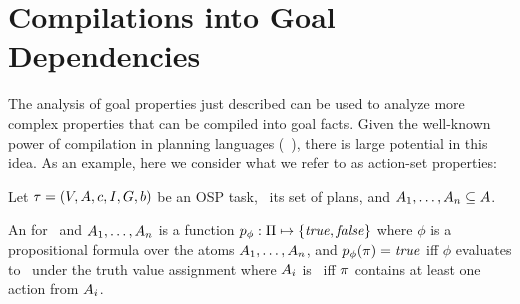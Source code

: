 \section{Compilations into Goal Dependencies}
\label{compilation}


The analysis of goal properties just described can be used to analyze
more complex properties that can be compiled into goal facts. Given
the well-known power of compilation in planning languages
(\eg\ \cite{gazen:knoblock:ecp-97,nebel:jair-00,edelkamp:icaps-06,palacios:geffner:jair-09,baier:etal:ai-09}),
there is large potential in this idea. As an example, here we consider
what we refer to as action-set properties:

%
\begin{definition}\label{def:action-set-properties}
Let $\tau =
(V,\allowbreak A,\allowbreak{\ensuremath{c}},\allowbreak I,\allowbreak G,\allowbreak{\ensuremath{b}})$
be an OSP task, \plans\ its set of plans, and $A_1, \dots, A_n
\subseteq A$.

An  for \task\ and $A_1, \dots,
A_n$ is a function $p_\phi : \Pi \mapsto \{\mathit{true}, \mathit{false}\}$
where $\phi$ is a propositional formula over the atoms $A_1,
\dots, A_n$, and $p_\phi(\pi) = \mathit{true}$ iff $\phi$ evaluates
to \true\ under the truth value assignment where $A_i$ is
\true\ iff $\pi$ contains at least one action from $A_i$.
\end{definition}

